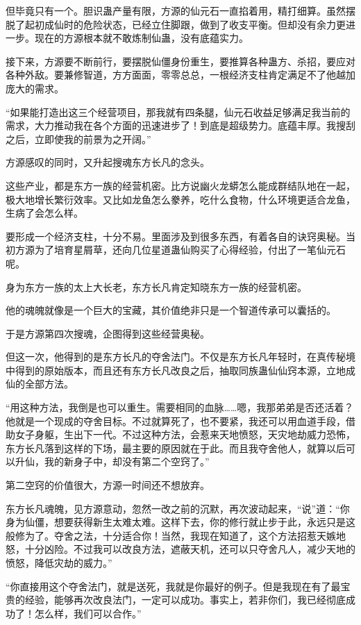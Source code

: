 \begin{this_body}
但毕竟只有一个。胆识蛊产量有限，方源的仙元石一直掐着用，精打细算。虽然摆脱了起初成仙时的危险状态，已经立住脚跟，做到了收支平衡。但却没有余力更进一步。现在的方源根本就不敢炼制仙蛊，没有底蕴实力。

接下来，方源要不断前行，要摆脱仙僵身份重生，要推算各种蛊方、杀招，要应对各种外敌。要兼修智道，方方面面，零零总总，一根经济支柱肯定满足不了他越加庞大的需求。

“如果能打造出这三个经营项目，那我就有四条腿，仙元石收益足够满足我当前的需求，大力推动我在各个方面的迅速进步了！到底是超级势力。底蕴丰厚。我搜刮之后，立即使我的前景为之开阔。”

方源感叹的同时，又升起搜魂东方长凡的念头。

这些产业，都是东方一族的经营机密。比方说幽火龙蟒怎么能成群结队地在一起，极大地增长繁衍效率。又比如龙鱼怎么豢养，吃什么食物，什么环境更适合龙鱼，生病了会怎么样。

要形成一个经济支柱，十分不易。里面涉及到很多东西，有着各自的诀窍奥秘。当初方源为了培育星屑草，还向几位星道蛊仙购买了心得经验，付出了一笔仙元石呢。

身为东方一族的太上大长老，东方长凡肯定知晓东方一族的经营机密。

他的魂魄就像是一个巨大的宝藏，其价值绝非只是一个智道传承可以囊括的。

于是方源第四次搜魂，企图得到这些经营奥秘。

但这一次，他得到的是东方长凡的夺舍法门。不仅是东方长凡年轻时，在真传秘境中得到的原始版本，而且还有东方长凡改良之后，抽取同族蛊仙仙窍本源，立地成仙的全部方法。

“用这种方法，我倒是也可以重生。需要相同的血脉……嗯，我那弟弟是否还活着？他就是一个现成的夺舍目标。不过就算死了，也不要紧，我还可以用血道手段，借助女子身躯，生出下一代。不过这种方法，会惹来天地愤怒，天灾地劫威力恐怖，东方长凡落到这样的下场，最主要的原因就在于此。而且我夺舍他人，就算以后可以升仙，我的新身子中，却没有第二个空窍了。”

第二空窍的价值很大，方源一时间还不想放弃。

东方长凡魂魄，见方源意动，忽然一改之前的沉默，再次波动起来，“说”道：“你身为仙僵，想要获得新生太难太难。这样下去，你的修行就止步于此，永远只是这般修为了。夺舍之法，十分适合你！当然，我现在知道了，这个方法招惹天嫉地怒，十分凶险。不过我可以改良方法，遮蔽天机，还可以只夺舍凡人，减少天地的愤怒，降低灾劫的威力。”

“你直接用这个夺舍法门，就是送死，我就是你最好的例子。但是我现在有了最宝贵的经验，能够再次改良法门，一定可以成功。事实上，若非你们，我已经彻底成功了！怎么样，我们可以合作。”


\end{this_body}
